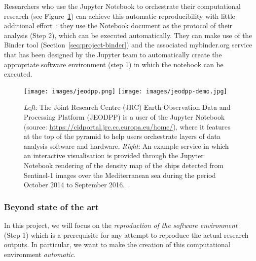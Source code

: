 \medskip Researchers who use the Jupyter Notebook to orchestrate their
computational research (see Figure~\ref{fig:jeodpp}) can achieve this automatic
reproducibility with little additional effort~\cite{Beg2021}: they use the Notebook document as
the protocol of their analysis (Step 2), which can be executed automatically.
They can make use of the Binder tool (Section~\ref{seq:project-binder}) and the
associated mybinder.org service that has
been designed by the Jupyter team to automatically create the appropriate
software environment (step 1) in which the notebook can be executed.

\begin{figure}[tb]
  \centering\texttt{[image: images/jeodpp.png]}
  \centering\texttt{[image: images/jeodpp-demo.jpg]}
  \caption{\emph{Left}: The Joint Research Centre (JRC) Earth Observation
    Data and Processing Platform (JEODPP) is a user of the
    Jupyter Notebook (source:
    \url{https://cidportal.jrc.ec.europa.eu/home/}), where it features
    at the top of the pyramid to help users orchestrate layers of data
    analysis software and hardware. \emph{Right}: An example
    service in which an interactive visualisation is provided through
    the Jupyter Notebook rendering of the density map of the ships
    detected from Sentinel-1 images over the Mediterranean sea during
    the period October 2014 to September 2016. \cite[Figure
    6]{Soille2018}. \label{fig:jeodpp}}
\end{figure}

\subsubsection{Beyond state of the art}

In this project, we will focus on the \emph{reproduction of the
  software environment} (Step 1) which is a prerequisite for any attempt to
reproduce the actual research outputs. In particular, we want to make the
creation of this computational environment \emph{automatic}.

